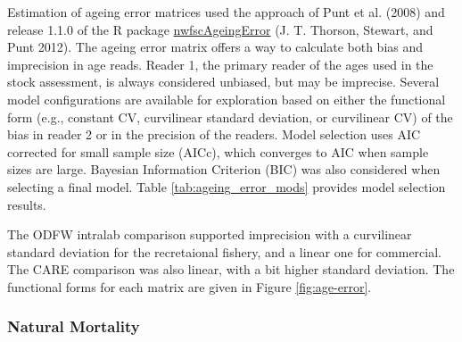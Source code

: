 \documentclass[11pt,
  english,
  a4paper,
]{article}
\begin{document}
\leavevmode\tagmcend\tagstructend\par


Estimation of ageing error matrices used the approach of Punt et al. {(2008)\leavevmode\tagmcend\tagstructend} and release 1.1.0 of the R package \href{https://github.com/nwfsc-assess/nwfscAgeingError}{nwfscAgeingError} {(J. T. Thorson, Stewart, and Punt 2012)\leavevmode\tagmcend\tagstructend}. The ageing error matrix offers a way to calculate both bias and imprecision in age reads. Reader 1, the primary reader of the ages used in the stock assessment, is always considered unbiased, but may be imprecise. Several model configurations are available for exploration based on either the functional form (e.g., constant CV, curvilinear standard deviation, or curvilinear CV) of the bias in reader 2 or in the precision of the readers. Model selection uses AIC corrected for small sample size (AICc), which converges to AIC when sample sizes are large. Bayesian Information Criterion (BIC) was also considered when selecting a final model. Table \ref{tab:ageing_error_mods} provides model selection results.

\leavevmode\tagmcend\tagstructend\par


The ODFW intralab comparison supported imprecision with a curvilinear standard deviation for the recretaional fishery, and a linear one for commercial. The CARE comparison was also linear, with a bit higher standard deviation. The functional forms for each matrix are given in Figure \ref{fig:age-error}.

\leavevmode\tagmcend\tagstructend\par


\hypertarget{natural-mortality}{%
\subsubsection{Natural Mortality}\label{natural-mortality}}

\leavevmode\tagmcend\tagstructend

\end{document}
